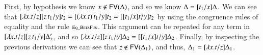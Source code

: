 \begin{report}
\begin{itemize}
First, by hypothesis we know $ \mathit{x}  \not\in \mathsf{FV}(  \Delta  ) $, and so we know $\Delta  =  [  \mathit{t_{{\mathrm{1}}}}  /  \mathit{x}  ]  \Delta$.  We can see
that $[   \lambda  \mathit{x}  .  \mathit{t}   /  \mathit{z}  ]  [  \mathit{z} \, \mathit{t_{{\mathrm{1}}}}  /  \mathit{y}  ]  \mathit{t_{{\mathrm{2}}}}  =  [   (  \lambda  \mathit{x}  .  \mathit{t}  )  \, \mathit{t_{{\mathrm{1}}}}  /  \mathit{y}  ]  \mathit{t_{{\mathrm{2}}}} = [  [  \mathit{t_{{\mathrm{1}}}}  /  \mathit{x}  ]  \mathit{t}  /  \mathit{y}  ]  \mathit{t_{{\mathrm{2}}}}$ by using the congruence rules
of equality and the rule $\scriptsize \textsc{Eq\_BetaFun}$.  This argument can be repeated for any term
in $[   \lambda  \mathit{x}  .  \mathit{t}   /  \mathit{z}  ]  [  \mathit{z} \, \mathit{t_{{\mathrm{1}}}}  /  \mathit{y}  ]  \Delta'_{{\mathrm{2}}}$, and so $[   \lambda  \mathit{x}  .  \mathit{t}   /  \mathit{z}  ]  [  \mathit{z} \, \mathit{t_{{\mathrm{1}}}}  /  \mathit{y}  ]  \Delta_{{\mathrm{2}}}  =  [  [  \mathit{t_{{\mathrm{1}}}}  /  \mathit{x}  ]  \mathit{t}  /  \mathit{y}  ]  \Delta_{{\mathrm{2}}}$.  Finally, by inspecting the previous
derivations we can see that $ \mathit{z}  \not\in \mathsf{FV}(  \Delta_{{\mathrm{1}}}  ) $, and thus, $\Delta_{{\mathrm{1}}}  =  [   \lambda  \mathit{x}  .  \mathit{t}   /  \mathit{z}  ]  \Delta_{{\mathrm{1}}}$.  


\end{itemize}
\end{report}

